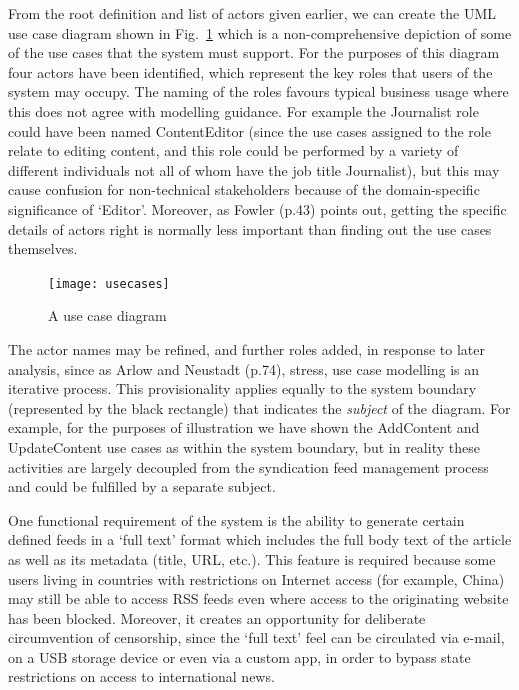 \documentclass[runningheads,a4paper]{llncs}
\begin{document}
From the root definition and list of actors given earlier, we can create the UML use case diagram shown in Fig.~\ref{fig:use-cases} which is a non-comprehensive depiction of some of the use cases that the system must support. For the purposes of this diagram four actors have been identified, which represent the key roles that users of the system may occupy. The naming of the roles favours typical business usage where this does not agree with modelling guidance. For example the \textsf{Journalist} role could have been named \textsf{ContentEditor} (since the use cases assigned to the role relate to editing content, and this role could be performed by a variety of different individuals not all of whom have the job title \textsf{Journalist}), but this may cause confusion for non-technical stakeholders because of the domain-specific significance of `Editor'. Moreover, as Fowler \cite{fowler2000} (p.43) points out, getting the specific details of actors right is normally less important than finding out the use cases themselves.

\begin{figure}
\centering
\texttt{[image: usecases]}
\caption{A use case diagram}
\label{fig:use-cases}
\end{figure}

The actor names may be refined, and further roles added, in response to later analysis, since as Arlow and Neustadt \cite{arlow} (p.74), stress, use case modelling is an iterative process. This provisionality applies equally to the system boundary (represented by the black rectangle) that indicates the \textit{subject} of the diagram. For example, for the purposes of illustration we have shown the \textsf{AddContent} and \textsf{UpdateContent} use cases as within the system boundary, but in reality these activities are largely decoupled from the syndication feed management process and could be fulfilled by a separate subject.

One functional requirement of the system is the ability to generate certain defined feeds in a `full text' format which includes the full body text of the article as well as its metadata (title, URL, etc.). This feature is required because some users living in countries with restrictions on Internet access (for example, China) may still be able to access RSS feeds even where access to the originating website has been blocked. Moreover, it creates an opportunity for deliberate circumvention of censorship, since the `full text' feel can be circulated via e-mail, on a USB storage device or even via a custom app, in order to bypass state restrictions on access to international news.
\end{document}
